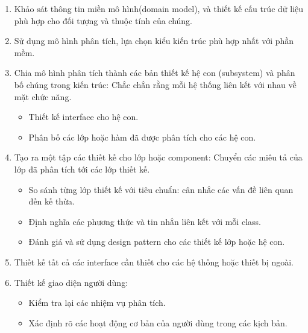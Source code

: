 \documentclass[./../SoftwareEngineering.tex]{subfiles}
\begin{document}
	\begin{multicols}{2}
		
		\begin{enumerate}
			\setlength{\itemsep}{1pt}
			\item Khảo sát thông tin miền mô hình(domain model), và thiết kế cấu trúc dữ liệu phù hợp cho đối tượng và thuộc tính của chúng. 
			
			\item Sử dụng mô hình phân tích, lựa chọn kiểu kiến trúc phù hợp nhất với phần mềm.
			
			\item Chia mô hình phân tích thành các bản thiết kế hệ con (subsystem) và phân bố chúng trong kiến trúc: Chắc chắn rằng mỗi hệ thống liên kết với nhau về mặt chức năng.
			\begin{itemize}
				\setlength{\itemsep}{1pt}
				\item Thiết kế interface cho hệ con.
				\item Phân bố các lớp hoặc hàm đã được phân tích cho các hệ con.
			\end{itemize}
			
			\item Tạo ra một tập các thiết kế cho lớp hoặc component: Chuyển các miêu tả của lớp đã phân tích tới các lớp thiết kế.
			\begin{itemize}
				\setlength{\itemsep}{1pt}
				\item So sánh từng lớp thiết kế với tiêu chuẩn: cân nhắc các vấn đề liên quan đến  kế thừa.
				
				\item Định nghĩa các phương thức và tin nhắn liên kết với mỗi class.
				
				\item Đánh giá và sử dụng design pattern cho các thiết kế lớp hoặc hệ con.	
			\end{itemize}
			
			\item Thiết kế tất cả các interface cần thiết cho các hệ thống hoặc thiết bị ngoài.
			
			\item Thiết kế giao diện người dùng:
			\begin{itemize}
				\setlength{\itemsep}{1pt}
				\item Kiểm tra lại các nhiệm vụ phân tích.
				
				\item Xác định rõ các hoạt động cơ bản của người dùng trong các kịch bản.
				

\end{itemize}
\end{enumerate}
\end{multicols}
\end{document}
